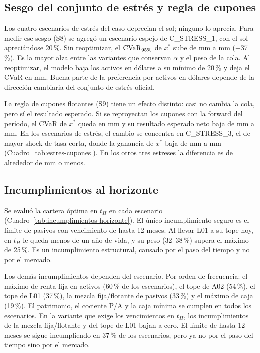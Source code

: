 \subsection{Sesgo del conjunto de estrés y regla de cupones}\label{subsec:sesgo-estres}
Los cuatro escenarios de estrés del caso deprecian el sol; ninguno lo aprecia. Para medir ese sesgo (S8)
se agregó un escenario espejo de C\_STRESS\_1, con el sol apreciándose 20\,\%. Sin reoptimizar, el
$\operatorname{CVaR}_{95\%}$ de $x^*$ sube de  mm a  mm (+37\,\%). Es la mayor alza entre las variantes
que conservan $\alpha$ y el peso de la cola. Al reoptimizar, el modelo baja los activos en dólares a su
mínimo de 20\,\% y deja el CVaR en  mm. Buena parte de la preferencia por activos en dólares
depende de la dirección cambiaria del conjunto de estrés oficial.

La regla de cupones flotantes (S9) tiene un efecto distinto: casi no cambia la cola, pero sí el resultado
esperado. Si se reproyectan los cupones con la forward del período, el CVaR de $x^*$ queda en  mm y
su resultado esperado neto baja de  mm a  mm. En los escenarios de estrés, el cambio se
concentra en C\_STRESS\_3, el de mayor shock de tasa corta, donde la ganancia de $x^*$ baja de
 mm a  mm (Cuadro~\ref{tab:estres-cupones}). En los otros tres estreses la diferencia es de
alrededor de  mm o menos.



\subsection{Incumplimientos al horizonte}
Se evaluó la cartera óptima en $t_H$ en cada escenario (Cuadro~\ref{tab:incumplimientos-horizonte}). El
único incumplimiento seguro es el límite de pasivos con vencimiento de hasta 12 meses. Al llevar L01 a su
tope hoy, en $t_H$ le queda menos de un año de vida, y su peso (32--38\,\%) supera el máximo de 25\,\%. Es un
incumplimiento estructural, causado por el paso del tiempo y no por el mercado.

Los demás incumplimientos dependen del escenario. Por orden de frecuencia: el máximo de renta fija en
activos (60\,\% de los escenarios), el tope de A02 (54\,\%), el tope de L01 (37\,\%), la mezcla
fija/flotante de pasivos (33\,\%) y el máximo de caja (19\,\%). El patrimonio, el cociente P/A y la caja mínima se cumplen en todos los escenarios. En la variante que
exige los vencimientos en $t_H$, los incumplimientos de la mezcla fija/flotante y del tope de L01 bajan a
cero. El límite de hasta 12 meses se sigue incumpliendo en 37\,\% de los escenarios, pero ya no por el paso
del tiempo sino por el mercado.


